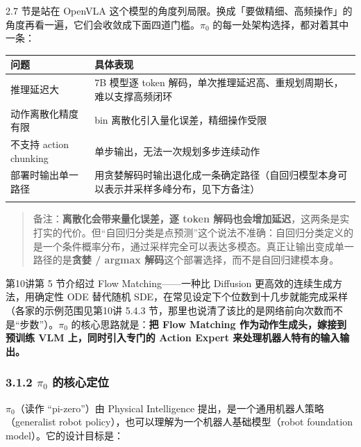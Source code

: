 \documentclass[
  chinese,
]{ctexart}
\begin{document}
2.7 节是站在 OpenVLA
这个模型的角度列局限。换成「要做精细、高频操作」的角度再看一遍，它们会收敛成下面四道门槛。\(\pi_0\)
的每一处架构选择，都对着其中一条：

\begin{center}
\begin{tabular}{@{}>{\raggedright\arraybackslash}p{} >{\raggedright\arraybackslash}p{}@{}}
\toprule\noalign{}
问题 & 具体表现 \\
\midrule\noalign{}
推理延迟大 & 7B 模型逐 token 解码，单次推理延迟高、重规划周期长，难以支撑高频闭环 \\
动作离散化精度有限 & 256 bin 离散化引入量化误差，精细操作受限 \\
不支持 action chunking & 单步输出，无法一次规划多步连续动作 \\
部署时输出单一路径 & 用贪婪解码时输出退化成一条确定路径（自回归模型本身可以表示并采样多峰分布，见下方备注） \\
\bottomrule\noalign{}
\end{tabular}
\end{center}

\begin{quote}
备注：\textbf{离散化会带来量化误差，逐 token
解码也会增加延迟}，这两条是实打实的代价。但``自回归分类是点预测''这个说法不准确：自回归分类定义的是一个条件概率分布，通过采样完全可以表达多模态。真正让输出变成单一路径的是\textbf{贪婪
/ argmax 解码}这个部署选择，而不是自回归建模本身。
\end{quote}

第10讲第 5 节介绍过 Flow Matching------一种比 Diffusion
更高效的连续生成方法，用确定性 ODE 替代随机
SDE，在常见设定下个位数到十几步就能完成采样（各家的示例范围见第10讲
5.4.3 节，那里也说清了该比的是网络前向次数而不是``步数''）。\(\pi_0\)
的核心思路就是：\textbf{把 Flow Matching 作为动作生成头，嫁接到预训练
VLM 上，同时引入专门的 Action Expert 来处理机器人特有的输入输出。}

\subsubsection{\texorpdfstring{3.1.2 \(\pi_0\)
的核心定位}{3.1.2 \textbackslash pi\_0 的核心定位}}\label{pi_0-ux7684ux6838ux5fc3ux5b9aux4f4d}

\(\pi_0\)（读作 ``pi-zero''）由 Physical Intelligence
提出，是一个通用机器人策略（generalist robot
policy），也可以理解为一个机器人基础模型（robot foundation
model）。它的设计目标是：
\end{document}
